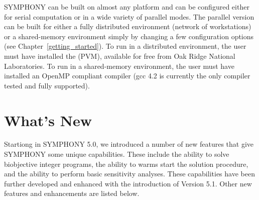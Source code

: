 SYMPHONY can be built on almost any platform and can be configured either for
serial computation or in a wide variety of parallel modes. The parallel
version can be built for either a fully distributed environment (network of
workstations) or a shared-memory environment simply by changing a few
configuration options (see Chapter~\ref{getting_started}). To run in a
distributed environment, the user must have installed the {\em
{}}
(PVM), available for free from Oak Ridge National Laboratories. To run in a
shared-memory environment, the user must have installed an OpenMP compliant
compiler (gcc 4.2 is currently the only compiler tested and fully supported).

\section{What's New}

Startiong in SYMPHONY 5.0, we introduced a number of new features that give
SYMPHONY some unique capabilities. These include the ability to solve
biobjective integer programs, the ability to warms start the solution
procedure, and the ability to perform basic sensitivity analyses. These
capabilities have been further developed and enhanced with the introduction of
Version 5.1. Other new features and enhancements are listed below.

